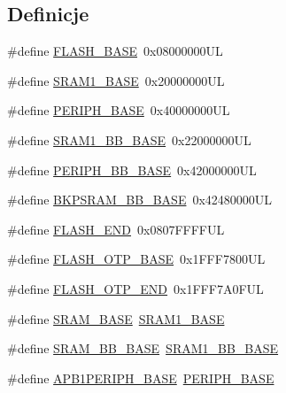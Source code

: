 \subsection*{Definicje}
\begin{DoxyCompactItemize}
\item 
\#define \hyperlink{group___peripheral__memory__map_ga23a9099a5f8fc9c6e253c0eecb2be8db}{F\+L\+A\+S\+H\+\_\+\+B\+A\+SE}~0x08000000\+UL
\item 
\#define \hyperlink{group___peripheral__memory__map_ga7d0fbfb8894012dbbb96754b95e562cd}{S\+R\+A\+M1\+\_\+\+B\+A\+SE}~0x20000000\+UL
\item 
\#define \hyperlink{group___peripheral__memory__map_ga9171f49478fa86d932f89e78e73b88b0}{P\+E\+R\+I\+P\+H\+\_\+\+B\+A\+SE}~0x40000000\+UL
\item 
\#define \hyperlink{group___peripheral__memory__map_gac4c4f61082e4b168f29d9cf97dc3ca5c}{S\+R\+A\+M1\+\_\+\+B\+B\+\_\+\+B\+A\+SE}~0x22000000\+UL
\item 
\#define \hyperlink{group___peripheral__memory__map_gaed7efc100877000845c236ccdc9e144a}{P\+E\+R\+I\+P\+H\+\_\+\+B\+B\+\_\+\+B\+A\+SE}~0x42000000\+UL
\item 
\#define \hyperlink{group___peripheral__memory__map_gaee19a30c9fa326bb10b547e4eaf4e250}{B\+K\+P\+S\+R\+A\+M\+\_\+\+B\+B\+\_\+\+B\+A\+SE}~0x42480000\+UL
\item 
\#define \hyperlink{group___peripheral__memory__map_ga8be554f354e5aa65370f6db63d4f3ee4}{F\+L\+A\+S\+H\+\_\+\+E\+ND}~0x0807\+F\+F\+F\+F\+UL
\item 
\#define \hyperlink{group___peripheral__memory__map_ga91d296a67aec0da8f31c368cbc0eea94}{F\+L\+A\+S\+H\+\_\+\+O\+T\+P\+\_\+\+B\+A\+SE}~0x1\+F\+F\+F7800\+UL
\item 
\#define \hyperlink{group___peripheral__memory__map_ga5bec9c5a91e312fca36f256f508ceee1}{F\+L\+A\+S\+H\+\_\+\+O\+T\+P\+\_\+\+E\+ND}~0x1\+F\+F\+F7\+A0\+F\+UL
\item 
\#define \hyperlink{group___peripheral__memory__map_ga05e8f3d2e5868754a7cd88614955aecc}{S\+R\+A\+M\+\_\+\+B\+A\+SE}~\hyperlink{group___peripheral__memory__map_ga7d0fbfb8894012dbbb96754b95e562cd}{S\+R\+A\+M1\+\_\+\+B\+A\+SE}
\item 
\#define \hyperlink{group___peripheral__memory__map_gad3548b6e2f017f39d399358f3ac98454}{S\+R\+A\+M\+\_\+\+B\+B\+\_\+\+B\+A\+SE}~\hyperlink{group___peripheral__memory__map_gac4c4f61082e4b168f29d9cf97dc3ca5c}{S\+R\+A\+M1\+\_\+\+B\+B\+\_\+\+B\+A\+SE}
\item 
\#define \hyperlink{group___peripheral__memory__map_ga45666d911f39addd4c8c0a0ac3388cfb}{A\+P\+B1\+P\+E\+R\+I\+P\+H\+\_\+\+B\+A\+SE}~\hyperlink{group___peripheral__memory__map_ga9171f49478fa86d932f89e78e73b88b0}{P\+E\+R\+I\+P\+H\+\_\+\+B\+A\+SE}

\end{DoxyCompactItemize}

